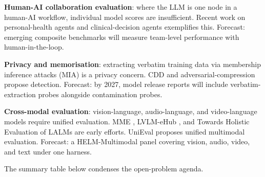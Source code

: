 \documentclass{article}
\begin{document}
\textbf{Human-AI collaboration evaluation}: where the LLM is one node in a human-AI workflow, individual model scores are insufficient. Recent work on personal-health agents \cite{merrill20262026} and clinical-decision agents \cite{schmidgall20262026} exemplifies this. Forecast: emerging composite benchmarks will measure team-level performance with human-in-the-loop.

\textbf{Privacy and memorisation}: extracting verbatim training data via membership inference attacks (MIA) is a privacy concern. CDD \cite{sela2026nomemorizationnode} and adversarial-compression \cite{schwarzschild20242024} propose detection. Forecast: by 2027, model release reports will include verbatim-extraction probes alongside contamination probes.

\textbf{Cross-modal evaluation}: vision-language, audio-language, and video-language models require unified evaluation. MME \cite{fu20232023}, LVLM-eHub \cite{xu20232023}, and Towards Holistic Evaluation of LALMs \cite{yang20252025} are early efforts. UniEval \cite{li20252025} proposes unified multimodal evaluation. Forecast: a HELM-Multimodal panel covering vision, audio, video, and text under one harness.

The summary table below condenses the open-problem agenda.
\end{document}
